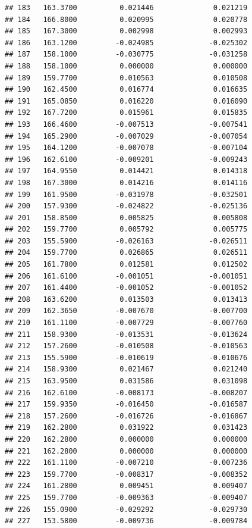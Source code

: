 \documentclass[
]{article}
\begin{document}
\begin{verbatim}
## 183   163.3700          0.021446              0.021219
## 184   166.8000          0.020995              0.020778
## 185   167.3000          0.002998              0.002993
## 186   163.1200         -0.024985             -0.025302
## 187   158.1000         -0.030775             -0.031258
## 188   158.1000          0.000000              0.000000
## 189   159.7700          0.010563              0.010508
## 190   162.4500          0.016774              0.016635
## 191   165.0850          0.016220              0.016090
## 192   167.7200          0.015961              0.015835
## 193   166.4600         -0.007513             -0.007541
## 194   165.2900         -0.007029             -0.007054
## 195   164.1200         -0.007078             -0.007104
## 196   162.6100         -0.009201             -0.009243
## 197   164.9550          0.014421              0.014318
## 198   167.3000          0.014216              0.014116
## 199   161.9500         -0.031978             -0.032501
## 200   157.9300         -0.024822             -0.025136
## 201   158.8500          0.005825              0.005808
## 202   159.7700          0.005792              0.005775
## 203   155.5900         -0.026163             -0.026511
## 204   159.7700          0.026865              0.026511
## 205   161.7800          0.012581              0.012502
## 206   161.6100         -0.001051             -0.001051
## 207   161.4400         -0.001052             -0.001052
## 208   163.6200          0.013503              0.013413
## 209   162.3650         -0.007670             -0.007700
## 210   161.1100         -0.007729             -0.007760
## 211   158.9300         -0.013531             -0.013624
## 212   157.2600         -0.010508             -0.010563
## 213   155.5900         -0.010619             -0.010676
## 214   158.9300          0.021467              0.021240
## 215   163.9500          0.031586              0.031098
## 216   162.6100         -0.008173             -0.008207
## 217   159.9350         -0.016450             -0.016587
## 218   157.2600         -0.016726             -0.016867
## 219   162.2800          0.031922              0.031423
## 220   162.2800          0.000000              0.000000
## 221   162.2800          0.000000              0.000000
## 222   161.1100         -0.007210             -0.007236
## 223   159.7700         -0.008317             -0.008352
## 224   161.2800          0.009451              0.009407
## 225   159.7700         -0.009363             -0.009407
## 226   155.0900         -0.029292             -0.029730
## 227   153.5800         -0.009736             -0.009784

\end{verbatim}
\end{document}
